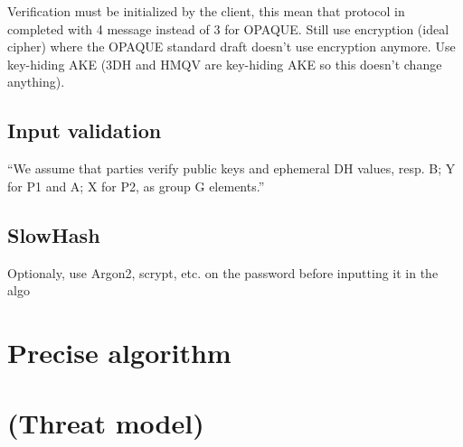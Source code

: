 \documentclass[../report.tex]{subfiles}
\begin{document}
Verification must be initialized by the client, this mean that protocol in completed with 4 message instead of 3 for OPAQUE.
Still use encryption (ideal cipher) where the OPAQUE standard draft doesn't use encryption anymore.
Use key-hiding AKE (3DH and HMQV are key-hiding AKE so this doesn't change anything).

\subsection{Input validation}
``We assume that parties verify public keys and ephemeral DH values, resp.
B; Y for P1 and A; X for P2, as group G elements.''

\subsection{SlowHash}
Optionaly, use Argon2, scrypt, etc. on the password before inputting it in the algo


\section{Precise algorithm}

\section{(Threat model)}
\end{document}
